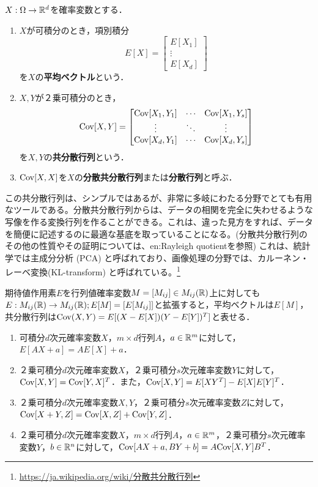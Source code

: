 \documentclass[uplatex,dvipdfmx]{jsreport}
\begin{document}
\begin{definition}
    $X:\Omega\to\mathbb{R}^d$を確率変数とする．
    \begin{enumerate}
        \item $X$が可積分のとき，項別積分
        \[E[X]=\begin{bmatrix}
            E[X_1]\\\vdots\\E[X_d]
        \end{bmatrix}\]
        を$X$の\textbf{平均ベクトル}という．
        \item $X,Y$が２乗可積分のとき，
        \[\mathrm{Cov}[X,Y]=\begin{bmatrix}
            \mathrm{Cov}[X_1,Y_1]&\cdots&\mathrm{Cov}[X_1,Y_s]\\
            \vdots&\ddots&\vdots\\
            \mathrm{Cov}[X_d,Y_1]&\cdots&\mathrm{Cov}[X_d,Y_s]
        \end{bmatrix}\]
        を$X,Y$の\textbf{共分散行列}という．
        \item $\mathrm{Cov}[X,X]$を$X$の\textbf{分散共分散行列}または\textbf{分散行列}と呼ぶ．
    \end{enumerate}
\end{definition}
\begin{remark}
    この共分散行列は、シンプルではあるが、非常に多岐にわたる分野でとても有用なツールである。分散共分散行列からは、データの相関を完全に失わせるような写像を作る変換行列を作ることができる。これは、違った見方をすれば、データを簡便に記述するのに最適な基底を取っていることになる。(分散共分散行列のその他の性質やその証明については、en:Rayleigh quotientを参照) これは、統計学では主成分分析 (PCA) と呼ばれており、画像処理の分野では、カルーネン・レーベ変換(KL-transform) と呼ばれている。\footnote{\url{https://ja.wikipedia.org/wiki/分散共分散行列}}
\end{remark}

\begin{notation}[期待値作用素の拡張]
    期待値作用素$E$を行列値確率変数$M=[M_{ij}]\in M_{ij}(\mathbb{R})$上に対しても$E:M_{ij}(\mathbb{R})\to M_{ij}(\mathbb{R});E[M]=[E[M_{ij}]]$と拡張すると，平均ベクトルは$E[M]$，共分散行列は$\mathrm{Cov}(X,Y)=E[(X-E[X])(Y-E[Y])^T]$と表せる．
\end{notation}

\begin{proposition}\mbox{}
    \begin{enumerate}
        \item 可積分$d$次元確率変数$X$，$m\times d$行列$A$，$a\in\mathbb{R}^m$に対して，$E[AX+a]=AE[X]+a$．
        \item ２乗可積分$d$次元確率変数$X$，２乗可積分$s$次元確率変数$Y$に対して，$\mathrm{Cov}[X,Y]=\mathrm{Cov}[Y,X]^T$．また，$\mathrm{Cov}[X,Y]=E[XY^T]-E[X]E[Y]^T$．
        \item ２乗可積分$d$次元確率変数$X,Y$，２乗可積分$s$次元確率変数$Z$に対して，$\mathrm{Cov}[X+Y,Z]=\mathrm{Cov}[X,Z]+\mathrm{Cov}[Y,Z]$．
        \item ２乗可積分$d$次元確率変数$X$，$m\times d$行列$A$，$a\in\mathbb{R}^m$，２乗可積分$s$次元確率変数$Y$，$b\in\mathbb{R}^n$に対して，$\mathrm{Cov}[AX+a,BY+b]=A\mathrm{Cov}[X,Y]B^T$．
    \end{enumerate}
\end{proposition}
\end{document}
